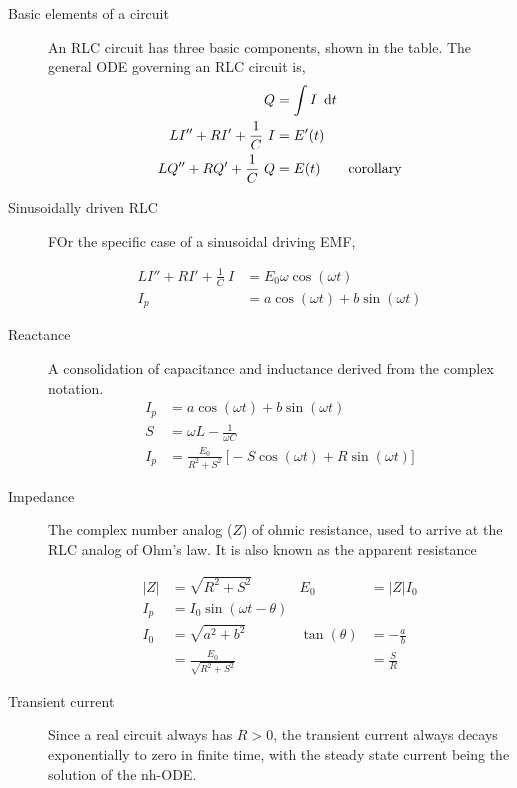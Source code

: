 \begin{description}
    \item[Basic elements of a circuit] An RLC circuit has three basic components, shown in the
        table. The general ODE governing an RLC circuit is,
        \begin{align}
            Q                           & = \int I\ \dl t                \\
            LI'' + RI' + \frac{1}{C}\ I & = E'(t)                        \\
            LQ'' + RQ' + \frac{1}{C}\ Q & = E(t) \qquad \text{corollary}
        \end{align}
    \item[Sinusoidally driven RLC] FOr the specific case of a sinusoidal driving EMF,

        \begin{align}
            LI'' + RI' + \frac{1}{C}\ I & = E_{0}\omega \cos(\omega t)        \\
            I_{p}                       & = a\cos(\omega t) + b\sin(\omega t)
        \end{align}


    \item[Reactance] A consolidation of capacitance and inductance derived from the complex
        notation.
        \begin{align}
            I_{p} & = a\cos(\omega t) + b\sin(\omega t)                                          \nonumber \\
            S     & = \omega L - \frac{1}{\omega C}                                                        \\
            I_{p} & = \frac{E_{0}}{R^{2} + S^{2}}\ \Big[-S\cos(\omega t) + R\sin(\omega t)\Big]
        \end{align}

    \item[Impedance] The complex number analog ($ Z $) of ohmic resistance, used to arrive at
        the RLC analog of Ohm's law. It is also known as the apparent resistance \par
        \begin{align}
            |Z|   & = \sqrt{R^{2} + S^{2}}               & E_{0}        & = |Z| I_{0}    \\
            I_{p} & = I_{0} \sin(\omega t - \theta)                                      \\
            I_{0} & = \sqrt{a^{2} + b^{2}}               & \tan(\theta) & = -\frac{a}{b} \\
                  & = \frac{E_{0}}{\sqrt{R^{2} + S^{2}}} &              & = \frac{S}{R}
        \end{align}

    \item[Transient current] Since a real circuit always has $ R > 0 $, the transient
        current always decays exponentially to zero in finite time, with the steady state
        current being the solution of the nh-ODE. \par
\end{description}


